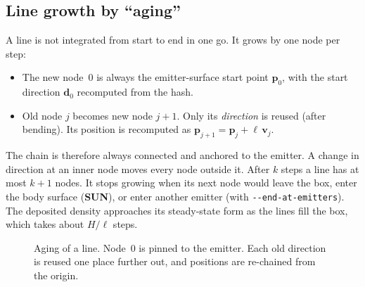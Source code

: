 \documentclass[12pt]{article}
\newcommand{\SUN}{\textcolor{sunc}{\textbf{\textsf{SUN}}}}
\newcommand{\opt}[1]{\texttt{-{}-#1}}
\newcommand{\vect}[1]{\mathbf{#1}}
\begin{document}
\subsection{Line growth by ``aging''}

A line is not integrated from start to end in one go. It grows by one node per step:
\begin{itemize}
  \item The new node~0 is always the emitter-surface start point
        $\vect p_0$, with the start direction $\vect d_0$ recomputed from the hash.
  \item Old node $j$ becomes new node $j+1$. Only its \emph{direction} is reused
        (after bending). Its position is recomputed as
        $\vect p_{j+1} = \vect p_j + \ell\,\vect v_j$.
\end{itemize}
The chain is therefore always connected and anchored to the emitter. A change in
direction at an inner node moves every node outside it. After $k$ steps a line
has at most $k+1$ nodes. It stops growing when its next node would leave the
box, enter the body surface (\SUN), or enter another emitter (with
\opt{end-at-emitters}). The deposited density approaches its steady-state
form as the lines fill the box, which takes about $H/\ell$ steps.

\begin{figure}[htb]
\centering
{}
\caption{Aging of a line. Node~0 is pinned to the emitter. Each old direction is
reused one place further out, and positions are re-chained from the origin.}
\end{figure}
\end{document}
